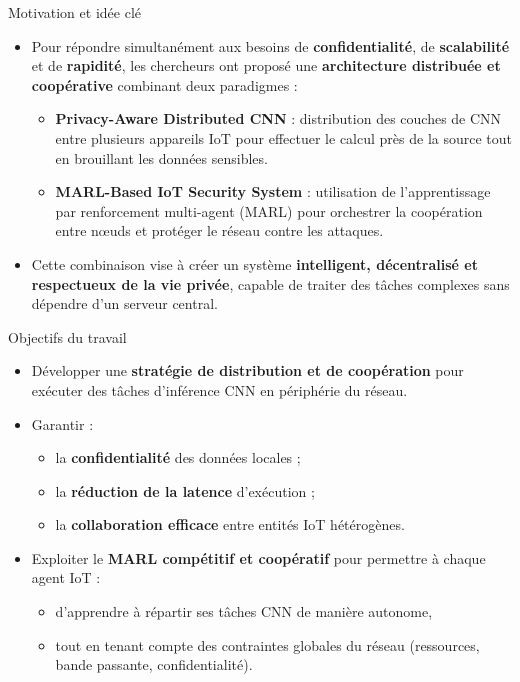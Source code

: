 \documentclass{beamer}
\begin{document}
\begin{frame}{Motivation et idée clé}
\begin{itemize}
    \item Pour répondre simultanément aux besoins de \textbf{confidentialité}, de \textbf{scalabilité} et de \textbf{rapidité},
    les chercheurs ont proposé une \textbf{architecture distribuée et coopérative} combinant deux paradigmes :
    \begin{itemize}
        \item  \textbf{Privacy-Aware Distributed CNN} : 
        distribution des couches de CNN entre plusieurs appareils IoT pour effectuer le calcul près de la source tout en brouillant les données sensibles.
        \item  \textbf{MARL-Based IoT Security System} : 
        utilisation de l’apprentissage par renforcement multi-agent (MARL) pour orchestrer la coopération entre nœuds et protéger le réseau contre les attaques.
    \end{itemize}
    \item Cette combinaison vise à créer un système \textbf{intelligent, décentralisé et respectueux de la vie privée},
    capable de traiter des tâches complexes sans dépendre d’un serveur central.
\end{itemize}
\end{frame}

\begin{frame}{Objectifs du travail}
\begin{itemize}
    \item Développer une \textbf{stratégie de distribution et de coopération} pour exécuter des tâches d’inférence CNN en périphérie du réseau.
    \item Garantir :
    \begin{itemize}
        \item  la \textbf{confidentialité} des données locales ;
        \item  la \textbf{réduction de la latence} d’exécution ;
        \item  la \textbf{collaboration efficace} entre entités IoT hétérogènes.
    \end{itemize}
    \item Exploiter le \textbf{MARL compétitif et coopératif} pour permettre à chaque agent IoT :
    \begin{itemize}
        \item d’apprendre à répartir ses tâches CNN de manière autonome,
        \item tout en tenant compte des contraintes globales du réseau (ressources, bande passante, confidentialité).
    \end{itemize}
\end{itemize}
\end{frame}
\end{document}

